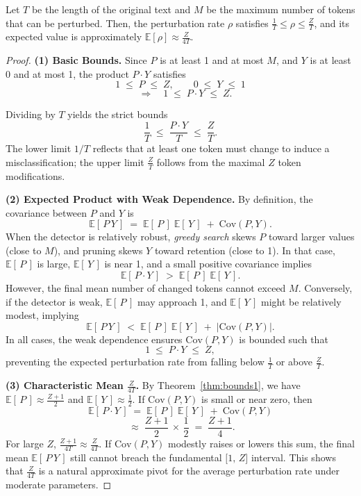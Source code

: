 \begin{theorem}
\label{thm:bounds}
Let \( T \) be the length of the original text and \( M \) be the maximum number of tokens that can be perturbed. Then, the perturbation rate \( \rho \) satisfies \( \frac{1}{T} \leq \rho \leq \frac{Z}{T} \), and its expected value is approximately \( \mathbb{E}[\rho] \approx \frac{Z}{4T} \).
\end{theorem}


\begin{proof}
\textbf{(1) Basic Bounds.}  
Since \(P\) is at least 1 and at most \(M\), and \(Y\) is at least 0 and at most 1, the product \(P \cdot Y\) satisfies
\[
  1 \;\le\; P \;\le\; Z,
  \qquad
  0 \;\le\; Y \;\le\; 1
\]
\[
  \quad\Longrightarrow\quad
  1 \;\le\; P \cdot Y \;\le\; Z.
\]

Dividing by \(T\) yields the strict bounds
\[
  \frac{1}{T}
  \;\le\;
  \frac{P \cdot Y}{T}
  \;\le\;
  \frac{Z}{T}.
\]
The lower limit \(1/T\) reflects that at least one token must change to induce a misclassification; the upper limit \(\tfrac{Z}{T}\) follows from the maximal \(Z\) token modifications.

\noindent
\textbf{(2) Expected Product with Weak Dependence.}  
By definition, the covariance between \(P\) and \(Y\) is
\[
  \mathbb{E}[\,P\,Y\,]
  \;=\;
  \mathbb{E}[\,P\,]\;\mathbb{E}[\,Y\,]
  \;+\;
  \mathrm{Cov}(P, Y).
\]
When the detector is relatively robust, \emph{greedy search} skews \(P\) toward larger values (close to \(M\)), and pruning skews \(Y\) toward retention (close to 1). In that case, \(\mathbb{E}[\,P\,]\) is large, \(\mathbb{E}[\,Y\,]\) is near 1, and a small positive covariance implies
\[
  \mathbb{E}[\,P \cdot Y\,]
  \;>\;
  \mathbb{E}[\,P\,]\;\mathbb{E}[\,Y\,].
\]
However, the final mean number of changed tokens cannot exceed \(M\). Conversely, if the detector is weak, \(\mathbb{E}[\,P\,]\) may approach 1, and \(\mathbb{E}[\,Y\,]\) might be relatively modest, implying 
\[
  \mathbb{E}[\,P\,Y\,]
  \;<\;
  \mathbb{E}[\,P\,]\;\mathbb{E}[\,Y\,]
  \;+\;
  |\mathrm{Cov}(P, Y)|.
\]
In all cases, the weak dependence ensures \(\mathrm{Cov}(P, Y)\) is bounded such that 
\[
  1
  \;\le\;
  P \cdot Y
  \;\le\;
  Z,
\]
preventing the expected perturbation rate from falling below \(\tfrac{1}{T}\) or above \(\tfrac{Z}{T}\).

\noindent
\textbf{(3) Characteristic Mean \(\frac{Z}{4T}\).}  
By Theorem~\ref{thm:bounds1}, we have \(\mathbb{E}[\,P\,]\approx \frac{Z+1}{2}\) and \(\mathbb{E}[\,Y\,]\approx \frac{1}{2}\). If \(\mathrm{Cov}(P, Y)\) is small or near zero, then
\[
  \mathbb{E}[\,P \cdot Y\,]
  \;=\;
  \mathbb{E}[\,P\,]\;\mathbb{E}[\,Y\,]
  \;+\;
  \mathrm{Cov}(P, Y)
\]
\[
  \;\approx\;
  \frac{Z+1}{2}\,\times\,\frac{1}{2}
  \;=\;
  \frac{Z+1}{4}.
\]
For large \(Z\), \(\frac{Z+1}{4T}\approx \frac{Z}{4T}\). If \(\mathrm{Cov}(P, Y)\) modestly raises or lowers this sum, the final mean \(\mathbb{E}[\,P\,Y\,]\) still cannot breach the fundamental \(\bigl[1,\,Z\bigr]\) interval. This shows that \(\frac{Z}{4T}\) is a natural approximate pivot for the average perturbation rate under moderate parameters. 


\end{proof}
